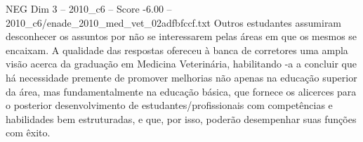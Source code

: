 \begin{textsample}{NEG Dim 3 – 2010\_c6 – Score -6.00 – 2010\_c6/enade\_2010\_med\_vet\_02adfbfccf.txt}
Outros estudantes assumiram desconhecer os assuntos por não se interessarem pelas áreas em que os mesmos se encaixam.
A qualidade das respostas ofereceu à banca de corretores uma ampla visão acerca da graduação em Medicina Veterinária, habilitando -a a concluir que há necessidade premente de promover melhorias não apenas na educação superior da área, mas fundamentalmente na educação básica, que fornece os alicerces para o posterior desenvolvimento de estudantes/profissionais com competências e habilidades bem estruturadas, e que, por isso, poderão desempenhar suas funções com êxito.

\end{textsample}

